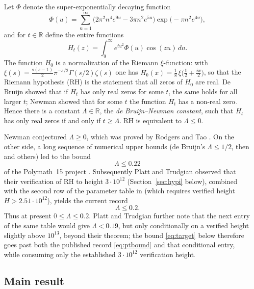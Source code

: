 \documentclass[11pt]{article}
\theoremstyle{definition}
\newcommand{\LB}{\Lambda}
\newcommand{\R}{\mathbb{R}}
\begin{document}
Let $\Phi$ denote the super-exponentially decaying function
\[
\Phi(u)=\sum_{n=1}^{\infty}
\bigl(2\pi^2n^4e^{9u}-3\pi n^2e^{5u}\bigr)
\exp\!\bigl(-\pi n^2e^{4u}\bigr),
\]
and for $t\in\R$ define the entire functions
\begin{equation}\label{eq:Ht}
H_t(z)=\int_0^\infty e^{tu^2}\Phi(u)\cos(zu)\,du .
\end{equation}
The function $H_0$ is a normalization of the Riemann $\xi$-function:
with $\xi(s)=\frac{s(s-1)}{2}\pi^{-s/2}\Gamma(s/2)\zeta(s)$ one has
$H_0(x)=\frac18\,\xi\!\bigl(\frac12+\frac{ix}2\bigr)$, so that the
Riemann hypothesis (RH) is the statement that all zeros of $H_0$ are
real. De Bruijn \cite{deBruijn} showed that if $H_t$ has only real
zeros for some $t$, the same holds for all larger $t$; Newman
\cite{Newman} showed that for some $t$ the function $H_t$ has a
non-real zero. Hence there is a constant $\LB\in\R$, the
\emph{de Bruijn--Newman constant}, such that $H_t$ has only real zeros
if and only if $t\ge\LB$. RH is equivalent to $\LB\le0$.

Newman conjectured $\LB\ge0$, which was proved by Rodgers and Tao
\cite{RodgersTao}. On the other side, a long sequence of numerical
upper bounds (de Bruijn's $\LB\le1/2$, then
\cite{CsordasNorfolkVarga,KKL} and others) led to the bound
\begin{equation}\label{eq:polymathbound}
\LB\le0.22
\end{equation}
of the Polymath~15 project \cite{Polymath}. Subsequently Platt and
Trudgian observed \cite[Corollary~2]{PlattTrudgian} that their
verification of RH to height $3\cdot10^{12}$
(Section~\ref{sec:hypi} below), combined with the second row of the
parameter table in \cite[Table~1, p.~65]{Polymath} (which requires
verified height $H>2.51\cdot10^{12}$), yields the current record
\begin{equation}\label{eq:ptbound}
\LB\le0.2 .
\end{equation}
Thus at present $0\le\LB\le0.2$. Platt and Trudgian further note
that the next entry of the same table would give $\LB<0.19$, but only
conditionally on a verified height slightly above $10^{13}$, beyond
their theorem; the bound \eqref{eq:target} below therefore
goes past both the published record \eqref{eq:ptbound} and that
conditional entry, while consuming only the established
$3\cdot10^{12}$ verification height.

\subsection{Main result}
\end{document}
